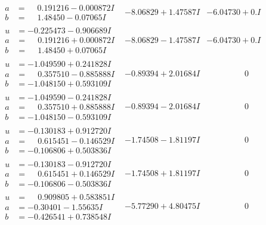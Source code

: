 \documentclass[1p]{elsarticle_modified}
\theoremstyle{definition}
\begin{document}
$$\begin{array}{c|c|c}
\begin{aligned}
a &= \phantom{-}0.191216 - 0.000872 I \\
b &= \phantom{-}1.48450 - 0.07065 I\end{aligned}
 & -8.06829 + 1.47587 I & -6.04730 + 0. I\phantom{ +0.000000I} \\ \hline\begin{aligned}
u &= -0.225473 - 0.906689 I \\
a &= \phantom{-}0.191216 + 0.000872 I \\
b &= \phantom{-}1.48450 + 0.07065 I\end{aligned}
 & -8.06829 - 1.47587 I & -6.04730 + 0. I\phantom{ +0.000000I} \\ \hline\begin{aligned}
u &= -1.049590 + 0.241828 I \\
a &= \phantom{-}0.357510 - 0.885888 I \\
b &= -1.048150 + 0.593109 I\end{aligned}
 & -0.89394 + 2.01684 I & \phantom{-0.000000 } 0 \\ \hline\begin{aligned}
u &= -1.049590 - 0.241828 I \\
a &= \phantom{-}0.357510 + 0.885888 I \\
b &= -1.048150 - 0.593109 I\end{aligned}
 & -0.89394 - 2.01684 I & \phantom{-0.000000 } 0 \\ \hline\begin{aligned}
u &= -0.130183 + 0.912720 I \\
a &= \phantom{-}0.615451 - 0.146529 I \\
b &= -0.106806 + 0.503836 I\end{aligned}
 & -1.74508 - 1.81197 I & \phantom{-0.000000 } 0 \\ \hline\begin{aligned}
u &= -0.130183 - 0.912720 I \\
a &= \phantom{-}0.615451 + 0.146529 I \\
b &= -0.106806 - 0.503836 I\end{aligned}
 & -1.74508 + 1.81197 I & \phantom{-0.000000 } 0 \\ \hline\begin{aligned}
u &= \phantom{-}0.909805 + 0.583851 I \\
a &= -0.30401 - 1.55635 I \\
b &= -0.426541 + 0.738548 I\end{aligned}
 & -5.77290 + 4.80475 I & \phantom{-0.000000 } 0 \\ \hline\begin{aligned}

\end{aligned}
\end{array}$$
\end{document}
